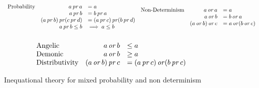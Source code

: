 \begin{figure}[h!]
    \begin{equation*}
        \begin{array}{lrl}
            \text{Probability} & a \operatorname{\mathit{pr}} a &= a \\
                        & a \operatorname{\mathit{pr}} b &= b \operatorname{\mathit{pr}} a \\
                        & (a \operatorname{\mathit{pr}} b) \operatorname{\mathit{pr}} (c \operatorname{\mathit{pr}} d) &= (a \operatorname{\mathit{pr}} c) \operatorname{\mathit{pr}} (b \operatorname{\mathit{pr}} d) \\
                        & a \operatorname{\mathit{pr}} b \leq b &\implies a \leq b  \\
            \\
        \end{array}
        \begin{array}{lrl}
            \text{Non-Determinism} & a \operatorname{\mathit{or}} a &= a \\
                        & a \operatorname{\mathit{or}} b &= b \operatorname{\mathit{or}} a \\
                        & (a \operatorname{\mathit{or}} b) \operatorname{\mathit{or}} c &= a \operatorname{\mathit{or}} (b \operatorname{\mathit{or}} c) \\
            \\
        \end{array}
    \end{equation*}
    \begin{equation*}
        \begin{array}{lrl}

            \text{Angelic} & a \operatorname{\mathit{or}} b &\leq a \\ 
            \text{Demonic} & a \operatorname{\mathit{or}} b &\geq a \\ 
            \text{Distributivity}
            & (a \operatorname{\mathit{or}} b) \operatorname{\mathit{pr}} c &= (a \operatorname{\mathit{pr}} c) \operatorname{\mathit{or}} (b \operatorname{\mathit{pr}} c)
        \end{array}
    \end{equation*}
    \caption{Inequational theory for mixed probability and non
    determinism}
    \label{fig:axiomsmixed}
\end{figure}





